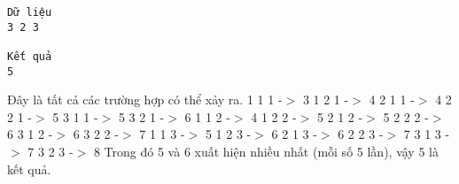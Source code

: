 \begin{verbatim}
Dữ liệu
3 2 3

Kết quả
5
\end{verbatim}
Đây là tất cả các trường hợp có thể xảy ra. 1 1 1 -$>$ 3  1 2 1 -$>$ 4  2 1 1 -$>$ 4  2 2 1 -$>$ 5  3 1 1 -$>$ 5  3 2 1 -$>$ 6 1 1 2 -$>$ 4  1 2 2 -$>$ 5  2 1 2 -$>$ 5  2 2 2 -$>$ 6  3 1 2 -$>$ 6  3 2 2 -$>$ 7 1 1 3 -$>$ 5  1 2 3 -$>$ 6  2 1 3 -$>$ 6  2 2 3 -$>$ 7  3 1 3 -$>$ 7  3 2 3 -$>$ 8 Trong đó 5 và 6 xuất hiện nhiều nhất (mỗi số 5 lần), vậy 5 là kết quả.
